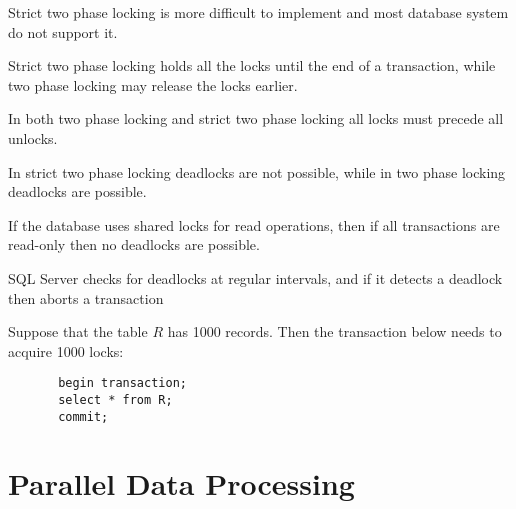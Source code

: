 \documentclass[addpoints,answers,12pt]{exam}
\begin{document}
\begin{questions}
\begin{parts}
\begin{subparts}
  \vfill

  \subpart Strict two phase locking is more difficult to implement and
  most database system do not support it. 

  \vfill

  \subpart Strict two phase locking holds all the locks until the end
  of a transaction, while two phase locking may release the locks
  earlier. 

  \vfill

% 

\newpage

  \subpart In both two phase locking and strict two phase locking all
  locks must precede all unlocks. 

  \vfill

  \subpart In strict two phase locking deadlocks are not possible,
  while in two phase locking deadlocks are
  possible. 

  \vfill

  \subpart If the database uses shared locks for read operations, then
  if all transactions are read-only then no deadlocks are possible.

  \vfill

  \subpart SQL Server checks for deadlocks at regular intervals, and
  if it detects a deadlock then aborts a transaction

  \vfill

  \subpart Suppose that the table $R$ has 1000 records.  Then the
  transaction below needs to acquire 1000 locks:

\begin{verbatim}
       begin transaction;
       select * from R;
       commit;
\end{verbatim}



\end{subparts}


\end{parts}

\newpage

\section{Parallel Data Processing}


\end{questions}
\end{document}
